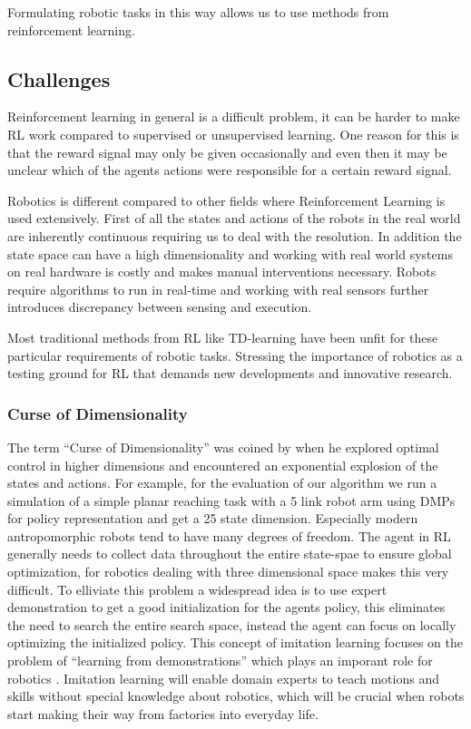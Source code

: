 Formulating robotic tasks in this way allows us to use methods from
reinforcement learning. 

\subsection{Challenges}
Reinforcement learning in general is a difficult problem, it can be harder
to make RL work compared to supervised or unsupervised learning. One reason
for this is that the reward signal may only be given occasionally and
even then it may be unclear which of
the agents actions were responsible for a certain
reward signal. 

Robotics is different compared to other fields where Reinforcement Learning
is used extensively. First of all the states and actions of the robots in the
real world are inherently continuous requiring us to
deal with the resolution.
In addition the state space can have a high dimensionality and
working with real world systems on real hardware is costly and
makes manual interventions necessary.
Robots require algorithms to run in real-time and working with
real sensors further introduces discrepancy between sensing and
execution.

Most traditional methods from RL like
TD-learning \cite{sutton2018reinforcement}
have been unfit for these particular requirements of robotic tasks.
Stressing the importance of robotics as a testing ground for RL that
demands new developments and innovative research.

\subsubsection{Curse of Dimensionality}
The term ``Curse of Dimensionality'' was coined by \citet{Bellman:1957} when
he explored optimal control in higher dimensions and encountered
an exponential explosion of the states and actions.
For example, for the evaluation of our algorithm we run a simulation of a
simple planar reaching task
with a 5 link robot arm using DMPs
for policy representation and get a 25 state dimension.
Especially modern antropomorphic robots tend to have many degrees of
freedom.
The agent in RL generally needs to collect data throughout the entire
state-spae to ensure global optimization, for robotics dealing with
three dimensional space makes this very difficult.
To elliviate this problem  a widespread idea is to use expert demonstration
to get a good initialization for the agents policy, this
eliminates the need to search the entire search space, instead the
agent can focus on locally optimizing the initialized policy.
This concept of imitation learning focuses on the problem of ``learning
from demonstrations'' which plays an imporant role
for robotics \citet{osa2018algorithmic}. Imitation learning
will enable domain experts to teach motions and
skills without special knowledge about robotics, which will be crucial
when robots start making their way from factories into everyday life.

